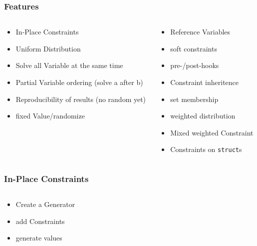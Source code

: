 \documentclass{RAbeamer}
\newcommand{\finished}{\Checkedbox\xspace}
\newcommand{\WIP}{\Writinghand\xspace}
\newcommand{\planned}{\Crossedbox\xspace}
\begin{document}
\begin{frame}[fragile]
  \frametitle{Features}
  \begin{columns}[t]
    \begin{column}{5cm}
      \begin{itemize}
      \item In-Place Constraints \finished
      \item Uniform Distribution \planned
      \item Solve all Variable at the same time \finished
      \item Partial Variable ordering (solve a after b)  \planned 
      \item Reproducibility of results \finished (no random yet)
      \item fixed Value/randomize \finished
      \end{itemize}
    \end{column}
    \begin{column}{6cm}
      \begin{itemize}
      \item Reference Variables \finished
      \item soft constraints \finished
      \item pre-/post-hooks \planned
      \item Constraint inheritence \WIP
      \item set membership \planned
      \item weighted distribution \planned
      \item Mixed weighted Constraint \planned
      \item Constraints on \verb|struct|s \planned
      \end{itemize}
    \end{column}
  \end{columns}
\end{frame}

\begin{frame}[fragile]
  \frametitle{In-Place Constraints}
  \begin{columns}
    \begin{column}[]{5.5cm}
      \begin{itemize}
        \item Create a Generator
        \item add Constraints
        \item generate values
      \end{itemize}
    \end{column}
      
    \begin{column}[c]{7cm}
    \end{column}
  \end{columns}
\end{frame}
\end{document}
